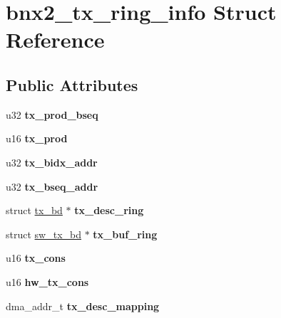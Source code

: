 \hypertarget{structbnx2__tx__ring__info}{
\section{bnx2\_\-tx\_\-ring\_\-info Struct Reference}
\label{structbnx2__tx__ring__info}
}
\subsection*{Public Attributes}
\begin{DoxyCompactItemize}
\item 
\hypertarget{structbnx2__tx__ring__info_a6202c76583d131408011b1d0eeb1799f}{
u32 {\bfseries tx\_\-prod\_\-bseq}}
\label{structbnx2__tx__ring__info_a6202c76583d131408011b1d0eeb1799f}

\item 
\hypertarget{structbnx2__tx__ring__info_aa3c906fc6c53dc2ea1d74c5438ca6458}{
u16 {\bfseries tx\_\-prod}}
\label{structbnx2__tx__ring__info_aa3c906fc6c53dc2ea1d74c5438ca6458}

\item 
\hypertarget{structbnx2__tx__ring__info_a56e2179cbd25195b61240d0aaeed66d8}{
u32 {\bfseries tx\_\-bidx\_\-addr}}
\label{structbnx2__tx__ring__info_a56e2179cbd25195b61240d0aaeed66d8}

\item 
\hypertarget{structbnx2__tx__ring__info_affd523f5de51f35e562e490332680f85}{
u32 {\bfseries tx\_\-bseq\_\-addr}}
\label{structbnx2__tx__ring__info_affd523f5de51f35e562e490332680f85}

\item 
\hypertarget{structbnx2__tx__ring__info_ad4686f8d979cfbb895033be66bb0728b}{
struct \hyperlink{structtx__bd}{tx\_\-bd} $\ast$ {\bfseries tx\_\-desc\_\-ring}}
\label{structbnx2__tx__ring__info_ad4686f8d979cfbb895033be66bb0728b}

\item 
\hypertarget{structbnx2__tx__ring__info_ac69abd6ce58316e294f49e0743876df0}{
struct \hyperlink{structsw__tx__bd}{sw\_\-tx\_\-bd} $\ast$ {\bfseries tx\_\-buf\_\-ring}}
\label{structbnx2__tx__ring__info_ac69abd6ce58316e294f49e0743876df0}

\item 
\hypertarget{structbnx2__tx__ring__info_a656f141a389d7d6aa8b357ad213da61b}{
u16 {\bfseries tx\_\-cons}}
\label{structbnx2__tx__ring__info_a656f141a389d7d6aa8b357ad213da61b}

\item 
\hypertarget{structbnx2__tx__ring__info_aeef4a3c81a26bcabfa3e2adc37f3242c}{
u16 {\bfseries hw\_\-tx\_\-cons}}
\label{structbnx2__tx__ring__info_aeef4a3c81a26bcabfa3e2adc37f3242c}

\item 
\hypertarget{structbnx2__tx__ring__info_a4c2b7b1c1384e4d3bd7054747d54772a}{
dma\_\-addr\_\-t {\bfseries tx\_\-desc\_\-mapping}}
\label{structbnx2__tx__ring__info_a4c2b7b1c1384e4d3bd7054747d54772a}

\end{DoxyCompactItemize}


